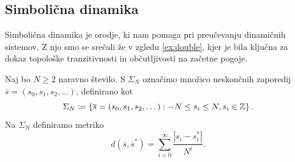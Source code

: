 



\subsection{Simbolična dinamika}

Simbolična dinamika je orodje, ki nam pomaga pri preučevanju dinamičnih sistemov. Z njo smo se srečali že v zgledu \ref{ex:double}, kjer je bila ključna za dokaz topološke tranzitivnosti in občutljivosti na začetne pogoje.

Naj bo \(N \geq 2\) naravno število. S \(\Sigma_N\) označimo množico neskončnih zaporedij \(\overline{s} = (s_0, s_1, s_2, \dots)\), definirano kot
\[\Sigma_N \coloneq \left\{ \overline{s} = (s_0, s_1, s_2, \dots) : - N \leq s_i \leq N, s_i \in \mathbb Z \right\}.\]
Na \(\Sigma_N\) definiramo metriko
\[d (\overline{s}, \overline{s}^*) = \sum_{i = 0}^{\infty} \frac{|s_i - s_i^*|}{N^i}.\]
%

